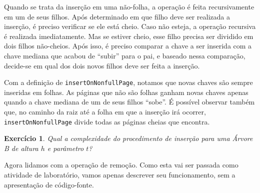 \documentclass[11pt]{article}
\newtheorem{exercicio}{Exercício}
\begin{document}
Quando se trata da inserção em uma não-folha, a operação é feita
recursivamente em um de seus filhos.  Após determinado em que
filho deve ser realizada a inserção, é preciso verificar se ele
está cheio. Caso não esteja, a operação recursiva é realizada
imediatamente.  Mas se estiver cheio, esse filho precisa ser
dividido em dois filhos não-cheios. Após isso, é preciso comparar
a chave a ser inserida com a chave mediana que acabou de ``subir''
para o pai, e baseado nessa comparação, decide-se em qual dos dois
novos filhos deve ser feita a inserção.

Com a definição de \texttt{insertOnNonfullPage}, notamos que novas chaves
são sempre inseridas em folhas.  As páginas que não são folhas
ganham novas chaves apenas quando a chave mediana de um de seus
filhos ``sobe''.  É possível observar também que, no caminho da
raiz até a folha em que a inserção irá ocorrer,
\texttt{insertOnNonfullPage} divide todas as páginas cheias que encontra.

\begin{exercicio}
Qual a complexidade do procedimento de inserção para uma Árvore B
de altura \(h\) e parâmetro \(t\)?
\end{exercicio}

Agora lidamos com a operação de remoção.  Como esta vai ser
passada como atividade de laboratório, vamos apenas descrever seu
funcionamento, sem a apresentação de código-fonte.
\end{document}
